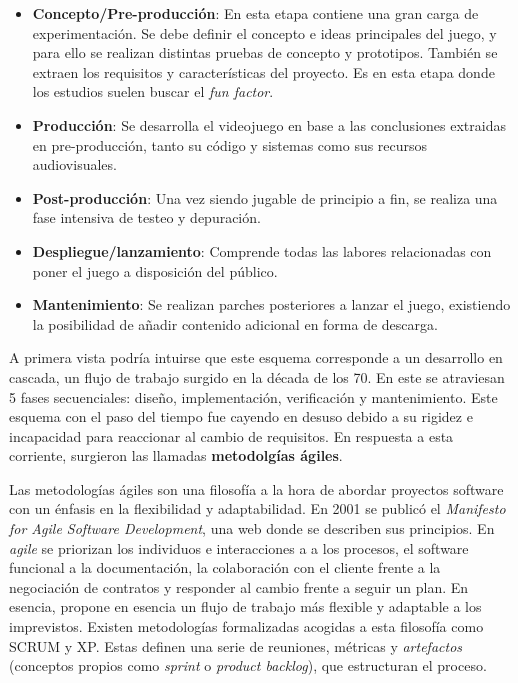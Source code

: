 \begin{itemize}
    \item \textbf{Concepto/Pre-producción}: En esta etapa contiene una gran carga de experimentación. Se debe definir el concepto e ideas principales del juego, y para ello se realizan distintas pruebas de concepto y prototipos. También se extraen los requisitos y características del proyecto. Es en esta etapa donde los estudios suelen buscar el \textit{fun factor}.
    \item \textbf{Producción}: Se desarrolla el videojuego en base a las conclusiones extraidas en pre-producción, tanto su código y sistemas como sus recursos audiovisuales.
    \item \textbf{Post-producción}: Una vez siendo jugable de principio a fin, se realiza una fase intensiva de testeo y depuración.
    \item \textbf{Despliegue/lanzamiento}: Comprende todas las labores relacionadas con poner el juego a disposición del público.
    \item \textbf{Mantenimiento}: Se realizan parches posteriores a lanzar el juego, existiendo la posibilidad de añadir contenido adicional en forma de descarga.
\end{itemize}

A primera vista podría intuirse que este esquema corresponde a un desarrollo en cascada\cite{waterfall}, un flujo de trabajo surgido en la década de los 70. En este se atraviesan 5 fases secuenciales: diseño, implementación, verificación y mantenimiento. Este esquema con el paso del tiempo fue cayendo en desuso debido a su rigidez e incapacidad para reaccionar al cambio de requisitos. En respuesta a esta corriente, surgieron las llamadas \textbf{metodolgías ágiles}.

Las metodologías ágiles son una filosofía a la hora de abordar proyectos software con un énfasis en la flexibilidad y adaptabilidad. En 2001 se publicó el \textit{Manifesto for Agile Software Development}\cite{agile-manifesto}, una web donde se describen sus principios. En \textit{agile} se priorizan los individuos e interacciones a a los procesos, el software funcional a la documentación, la colaboración con el cliente frente a la negociación de contratos y responder al cambio frente a seguir un plan.  En esencia, propone en esencia un flujo de trabajo más flexible y adaptable a los imprevistos. Existen metodologías formalizadas acogidas a esta filosofía como SCRUM y XP. Estas definen una serie de reuniones, métricas y \textit{artefactos} (conceptos propios como \textit{sprint} o \textit{product backlog}), que estructuran el proceso.

